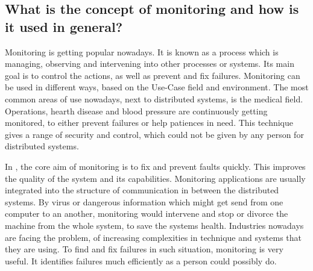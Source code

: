 \subsection{What is the concept of monitoring and how is it used in general?}
\label{subsec:ConceptMonitoring}

Monitoring is getting popular nowadays. It is known as a process which is managing, observing and intervening into other processes or systems.\cite{Jammes2012} Its main goal is to control the actions, as well as prevent and fix failures.\cite{Dinu2011} Monitoring can be used in different ways, based on the Use-Case field and environment.\cite{Dinu2011} The most common areas of use nowadays, next to distributed systems,\cite{Jammes2012} is the medical field. Operations, hearth disease and blood pressure are continuously getting monitored, to either prevent failures or help patiences in need. This technique gives a range of security and control, which could not be given by any person for distributed systems.\cite{Jammes2012}

 In \isds, the core aim of monitoring is to fix and prevent faults quickly. This improves the quality of the system and its capabilities. Monitoring applications are usually integrated into the structure of communication in between the distributed systems.\cite{Jammes2012} By virus or dangerous information which might get send from one computer to an another, monitoring would intervene and stop or divorce the machine from the whole system, to save the systems health. Industries nowadays are facing the problem, of increasing complexities in technique and systems that they are using.\cite{Jammes2012} To find and fix failures in such situation, monitoring is very useful. It identifies failures much efficiently as a person could possibly do.\cite{Jammes2012}
 

